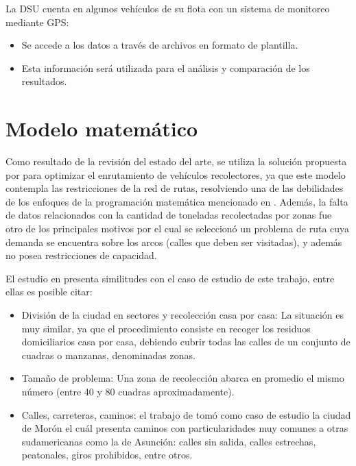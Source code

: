 La DSU cuenta en algunos vehículos de su flota con un sistema de monitoreo mediante GPS: 

\begin{itemize}
    \item Se accede a los datos a través de archivos en formato de plantilla.
    \item Esta información será utilizada para el análisis y comparación de los resultados.
\end{itemize}

\section{Modelo matemático}

Como resultado de la revisión del estado del arte, se utiliza la solución propuesta por \citet{Braier2017AnArgentina} para optimizar el enrutamiento de vehículos recolectores, ya que este modelo contempla las restricciones de la red de rutas, resolviendo una de las debilidades de los enfoques de la programación matemática mencionado en \cite{Sulemana2018OptimalMethods}. Además, la falta de datos relacionados con la cantidad de toneladas recolectadas por zonas fue otro de los principales motivos por el cual se seleccionó un problema de ruta cuya demanda se encuentra sobre los arcos (calles que deben ser visitadas), y además no posea restricciones de capacidad.

El estudio en \cite{Braier2017AnArgentina} presenta similitudes con el caso de estudio de este trabajo, entre ellas es posible citar:

\begin{itemize}
    \item División de la ciudad en sectores y recolección casa por casa: La situación es muy similar, ya que el procedimiento consiste en recoger los residuos domiciliarios casa por casa, debiendo cubrir todas las calles de un conjunto de cuadras o manzanas, denominadas zonas.
    \item Tamaño de problema: Una zona de recolección abarca en promedio el mismo número (entre 40 y 80 cuadras aproximadamente).
    \item Calles, carreteras, caminos: el trabajo de \citet{Braier2017AnArgentina} tomó como caso de estudio la ciudad de Morón el cuál presenta caminos con particularidades muy comunes a otras sudamericanas como la de Asunción: calles sin salida, calles estrechas, peatonales, giros prohibidos, entre otros.
\end{itemize}

